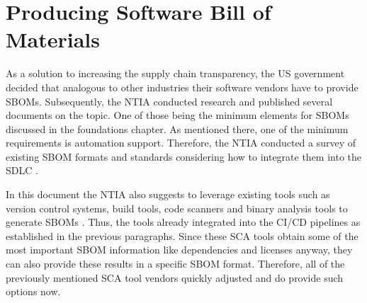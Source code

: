 \section{Producing Software Bill of Materials}
As a solution to increasing the supply chain transparency, the US government decided that analogous to other industries their software vendors have to provide SBOMs. Subsequently, the NTIA conducted research and published several documents on the topic. One of those being the minimum elements for SBOMs discussed in the foundations chapter. As mentioned there, one of the minimum requirements is automation support. Therefore, the NTIA conducted a survey of existing SBOM formats and standards considering how to integrate them into the SDLC \cite{SBOMSurvey}.\par
In this document the NTIA also suggests to leverage existing tools such as version control systems, build tools, code scanners and binary analysis tools to generate SBOMs \cite{SBOMSurvey}. Thus, the tools already integrated into the CI/CD pipelines as established in the previous paragraphs. Since these SCA tools obtain some of the most important SBOM information like dependencies and licenses anyway, they can also provide these results in a specific SBOM format. Therefore, all of the previously mentioned SCA tool vendors quickly adjusted and do provide such options now.


